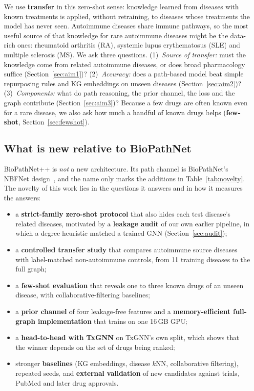 \documentclass{ieeeaccess}
\newcommand{\sysname}{BioPathNet++\xspace}
\begin{document}
We use \textbf{transfer} in this zero-shot sense: knowledge learned from diseases with known treatments is applied, without retraining, to diseases whose treatments the model has never seen. Autoimmune diseases share immune pathways, so the most useful source of that knowledge for rare autoimmune diseases might be the data-rich ones: rheumatoid arthritis (RA), systemic lupus erythematosus (SLE) and multiple sclerosis (MS). We ask three questions. (1)~\emph{Source of transfer:} must the knowledge come from related autoimmune diseases, or does broad pharmacology suffice (Section~\ref{sec:aim1})? (2)~\emph{Accuracy:} does a path-based model beat simple repurposing rules and KG embeddings on unseen diseases (Section~\ref{sec:aim2})? (3)~\emph{Components:} what do path reasoning, the prior channel, the loss and the graph contribute (Section~\ref{sec:aim3})? Because a few drugs are often known even for a rare disease, we also ask how much a handful of known drugs helps (\textbf{few-shot}, Section~\ref{sec:fewshot}).

\subsection{What is new relative to BioPathNet}
\label{sec:novelty}
\sysname is \emph{not} a new architecture. Its path channel is BioPathNet's NBFNet design~\cite{hu2026biopathnet,zhu2021nbfnet}, and the name only marks the additions in Table~\ref{tab:novelty}. The novelty of this work lies in the questions it answers and in how it measures the answers:
\begin{itemize}
\item a \textbf{strict-family zero-shot protocol} that also hides each test disease's related diseases, motivated by a \textbf{leakage audit} of our own earlier pipeline, in which a degree heuristic matched a trained GNN (Section~\ref{sec:audit});
\item a \textbf{controlled transfer study} that compares autoimmune source diseases with label-matched non-autoimmune controls, from 11 training diseases to the full graph;
\item a \textbf{few-shot evaluation} that reveals one to three known drugs of an unseen disease, with collaborative-filtering baselines;
\item a \textbf{prior channel} of four leakage-free features and a \textbf{memory-efficient full-graph implementation} that trains on one 16\,GB GPU;
\item a \textbf{head-to-head with TxGNN} on TxGNN's own split, which shows that the winner depends on the set of drugs being ranked;
\item stronger \textbf{baselines} (KG embeddings, disease $k$NN, collaborative filtering), repeated seeds, and \textbf{external validation} of new candidates against trials, PubMed and later drug approvals.
\end{itemize}
\end{document}
